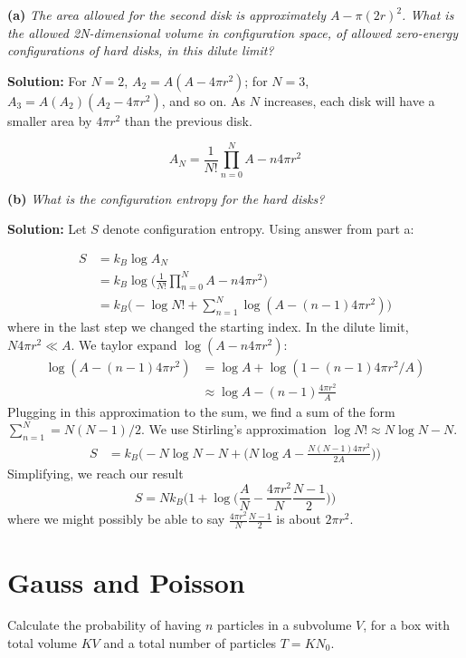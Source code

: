 \documentclass[11pt]{article}
\begin{document}
\vspace{2mm}
\noindent
\textbf{(a)}
\textit{The area allowed for the second disk is approximately $A - \pi(2r)^2$.
What is the allowed 2N-dimensional volume in configuration space, of allowed zero-energy configurations of hard disks, in this dilute limit?}

\vspace{2mm}
\noindent
\textbf{Solution:}
For $N = 2$, $A_2 = A(A-4\pi r^2)$; for $N = 3$, $A_3 = A(A_2)(A_2 - 4\pi r^2)$, and so on. As $N$ increases, each disk will have a smaller area by $4\pi r^2$ than the previous disk.

$$
\boxed{A_N = \frac{1}{N!}\prod_{n = 0}^{N}A - n4\pi r^2}
$$


\vspace{2mm}
\noindent
\textbf{(b)}
\textit{
What is the configuration entropy for the hard disks?}

\vspace{2mm}
\noindent
\textbf{Solution:}
Let $S$ denote configuration entropy. Using answer from part a:

\begin{align*}
S &= k_B \log{A_N}
\\
  &= k_B \log{\Big( \frac{1}{N!}\prod_{n = 0}^{N}A - n4\pi r^2 \Big)}
	\\
	&= k_B \Big( -\log{N!} + \sum_{n = 1}^{N} \log{(A - (n-1)4\pi r^2)} \Big)
\end{align*}
where in the last step we changed the starting index.
In the dilute limit, $N 4\pi r^2 \ll A$. We taylor expand $\log{(A - n4\pi r^2)}$:
\begin{align*}
\log{(A - (n-1)4\pi r^2)} &= \log{A} + \log{(1 - (n-1)4\pi r^2/A)}
\\
&\approx \log{A} - (n-1)\frac{4\pi r^2}{A}
\end{align*}
Plugging in this approximation to the sum, we find a sum of the form $\sum_{n = 1}^{N} = N(N-1)/2$.
We use Stirling's approximation $\log{N!} \approx N \log{N} - N$.
\begin{align*}
S &= k_B \Bigg( - N \log{N} - N + \bigg( N\log{A} - \frac{N(N-1) 4\pi r^2}{2A} \bigg) \Bigg)
\end{align*}
Simplifying, we reach our result
$$
\boxed{S = N k_B \bigg( 1 + \log{\Big( \frac{A}{N} - \frac{4\pi r^2}{N}\frac{N - 1}{2} \Big)} \bigg)}
$$
where we might possibly be able to say $ \frac{4\pi r^2}{N}\frac{N - 1}{2}$ is about $2\pi r^2$.
\section{Gauss and Poisson}
Calculate the probability of having $n$ particles in a subvolume $V$, for a box with total volume $KV$ and a total number of particles $T = KN_0$.
\end{document}
